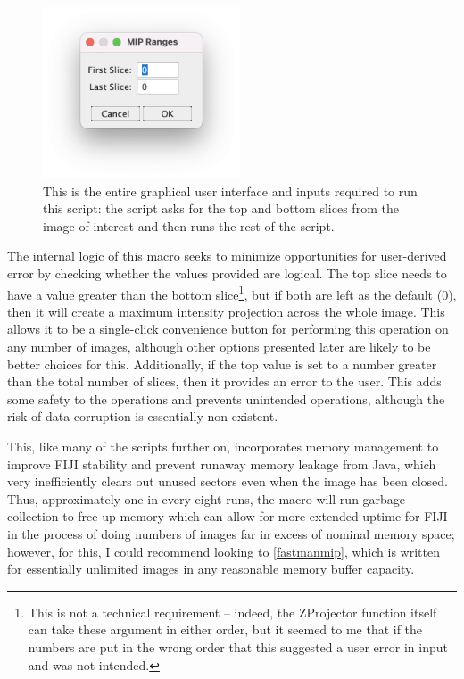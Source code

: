 \begin{figure}
\centering
\includegraphics[height=2in]{images/mipgui.png}
\caption{This is the entire graphical user interface and inputs required to run this script: the script asks for the top and bottom slices from the image of interest and then runs the rest of the script.}
\label{figure:mipgui}
\end{figure}

The internal logic of this macro seeks to minimize opportunities for user-derived error by checking whether the values provided are logical. The top slice needs to have a value greater than the bottom slice\footnote{This is not a technical requirement -- indeed, the ZProjector function itself can take these argument in either order, but it seemed to me that if the numbers are put in the wrong order that this suggested a user error in input and was not intended.}, but if both are left as the default (0), then it will create a maximum intensity projection across the whole image. This allows it to be a single-click convenience button for performing this operation on any number of images, although other options presented later are likely to be better choices for this. Additionally, if the top value is set to a number greater than the total number of slices, then it provides an error to the user. This adds some safety to the operations and prevents unintended operations, although the risk of data corruption is essentially non-existent. 

This, like many of the scripts further on, incorporates memory management to improve FIJI stability and prevent runaway memory leakage from Java, which very inefficiently clears out unused sectors even when the image has been closed. Thus, approximately one in every eight runs, the macro will run garbage collection to free up memory which can allow for more extended uptime for FIJI in the process of doing numbers of images far in excess of nominal memory space; however, for this, I could recommend looking to \autoref{fastmanmip}, which is written for essentially unlimited images in any reasonable memory buffer capacity.

